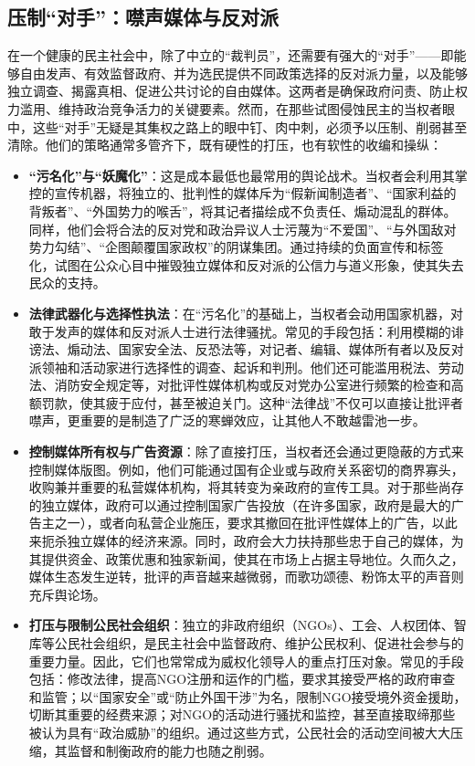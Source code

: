 \documentclass[UTF8, 10pt]{ctexbook}
\begin{document}
\subsection{压制“对手”：噤声媒体与反对派}
在一个健康的民主社会中，除了中立的“裁判员”，还需要有强大的“对手”——即能够自由发声、有效监督政府、并为选民提供不同政策选择的反对派力量，以及能够独立调查、揭露真相、促进公共讨论的自由媒体。这两者是确保政府问责、防止权力滥用、维持政治竞争活力的关键要素。然而，在那些试图侵蚀民主的当权者眼中，这些“对手”无疑是其集权之路上的眼中钉、肉中刺，必须予以压制、削弱甚至清除。他们的策略通常多管齐下，既有硬性的打压，也有软性的收编和操纵：
\begin{itemize}
    \item \textbf{“污名化”与“妖魔化”}：这是成本最低也最常用的舆论战术。当权者会利用其掌控的宣传机器，将独立的、批判性的媒体斥为“假新闻制造者”、“国家利益的背叛者”、“外国势力的喉舌”，将其记者描绘成不负责任、煽动混乱的群体。同样，他们会将合法的反对党和政治异议人士污蔑为“不爱国”、“与外国敌对势力勾结”、“企图颠覆国家政权”的阴谋集团。通过持续的负面宣传和标签化，试图在公众心目中摧毁独立媒体和反对派的公信力与道义形象，使其失去民众的支持。
    \item \textbf{法律武器化与选择性执法}：在“污名化”的基础上，当权者会动用国家机器，对敢于发声的媒体和反对派人士进行法律骚扰。常见的手段包括：利用模糊的诽谤法、煽动法、国家安全法、反恐法等，对记者、编辑、媒体所有者以及反对派领袖和活动家进行选择性的调查、起诉和判刑。他们还可能滥用税法、劳动法、消防安全规定等，对批评性媒体机构或反对党办公室进行频繁的检查和高额罚款，使其疲于应付，甚至被迫关门。这种“法律战”不仅可以直接让批评者噤声，更重要的是制造了广泛的寒蝉效应，让其他人不敢越雷池一步。
    \item \textbf{控制媒体所有权与广告资源}：除了直接打压，当权者还会通过更隐蔽的方式来控制媒体版图。例如，他们可能通过国有企业或与政府关系密切的商界寡头，收购兼并重要的私营媒体机构，将其转变为亲政府的宣传工具。对于那些尚存的独立媒体，政府可以通过控制国家广告投放（在许多国家，政府是最大的广告主之一），或者向私营企业施压，要求其撤回在批评性媒体上的广告，以此来扼杀独立媒体的经济来源。同时，政府会大力扶持那些忠于自己的媒体，为其提供资金、政策优惠和独家新闻，使其在市场上占据主导地位。久而久之，媒体生态发生逆转，批评的声音越来越微弱，而歌功颂德、粉饰太平的声音则充斥舆论场。
    \item \textbf{打压与限制公民社会组织}：独立的非政府组织（NGOs）、工会、人权团体、智库等公民社会组织，是民主社会中监督政府、维护公民权利、促进社会参与的重要力量。因此，它们也常常成为威权化领导人的重点打压对象。常见的手段包括：修改法律，提高NGO注册和运作的门槛，要求其接受严格的政府审查和监管；以“国家安全”或“防止外国干涉”为名，限制NGO接受境外资金援助，切断其重要的经费来源；对NGO的活动进行骚扰和监控，甚至直接取缔那些被认为具有“政治威胁”的组织。通过这些方式，公民社会的活动空间被大大压缩，其监督和制衡政府的能力也随之削弱。

\end{itemize}
\end{document}

